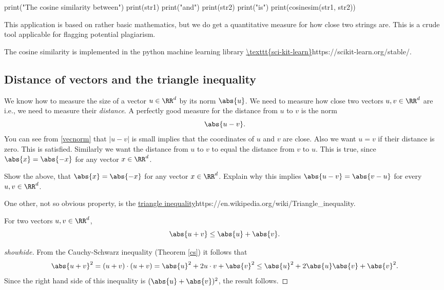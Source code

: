 \documentclass{article}
\begin{document}
\begin{example}
\begin{sage}
print("The cosine similarity between")
print(str1)
print("and")
print(str2)
print("is")
print(cosinesim(str1, str2))
\end{sage}


This application is based on rather basic mathematics, but we do get a quantitative measure for
how close two strings are. This is a crude tool applicable for flagging potential plagiarism.

The cosine similarity is implemented in the python machine
learning library \url{\texttt{sci-kit-learn}}{https://scikit-learn.org/stable/}.

\end{example}



\subsection{Distance of vectors and the triangle inequality}

We know how to measure the size of a vector $u\in \RR^d$ by its norm $\abs{u}$. We need
to measure how close two vectors $u, v\in \RR^d$ are i.e., we
need to measure their \emph{distance}. A perfectly good
measure for the distance from $u$ to $v$ is the norm
$$
\abs{u-v}.
$$
You can see from \eqref{vecnorm} that $|u-v|$ is small implies that
the coordinates of $u$ and $v$ are close. Also we want $u = v$ if
their distance is zero. This is satisfied. Similarly we want
the distance from $u$ to $v$ to equal the distance from $v$ to $u$. This is true,
since $\abs{x} = \abs{-x}$ for any vector $x\in \RR^d$.

\beginshex
Show the above, that $\abs{x} = \abs{-x}$ for any vector $x\in \RR^d$. Explain why
this implies $\abs{u - v} = \abs{v - u}$ for every $u, v\in \RR^d$.
\endshex

One other, not so obvious property, is the \url{triangle inequality}{https://en.wikipedia.org/wiki/Triangle_inequality}.

\begin{theorem}\label{thmtrineq}
  For two vectors $u, v\in \RR^d$,
  $$
  \abs{u + v} \leq \abs{u} + \abs{v}.
  $$
  \end{theorem}
    \begin{proof}[showhide]
      From the Cauchy-Schwarz inequality (Theorem \ref{cs}) it follows that 
      $$
      \abs{u+v}^2 = (u+v)\cdot (u+v) = \abs{u}^2 + 2 u\cdot v + \abs{v}^2 \leq \abs{u}^2 + 2 \abs{u}\abs{v} + \abs{v}^2.
      $$
      Since the right hand side of this inequality is $(\abs{u} + \abs{v})^2$, the result follows.
    \end{proof}
\end{document}
